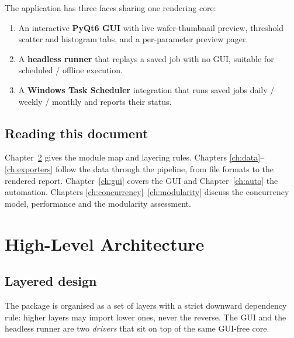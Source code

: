 \documentclass[11pt,a4paper]{report}
\begin{document}
The application has three faces sharing one rendering core:

\begin{enumerate}[leftmargin=1.6em]
  \item An interactive \textbf{PyQt6 GUI} with live wafer-thumbnail preview,
        threshold scatter and histogram tabs, and a per-parameter preview pager.
  \item A \textbf{headless runner} that replays a saved job with no GUI, suitable
        for scheduled / offline execution.
  \item A \textbf{Windows Task Scheduler} integration that runs saved jobs
        daily / weekly / monthly and reports their status.
\end{enumerate}

\section{Reading this document}
Chapter~\ref{ch:arch} gives the module map and layering rules. Chapters
\ref{ch:data}--\ref{ch:exporters} follow the data through the pipeline, from file
formats to the rendered report. Chapter~\ref{ch:gui} covers the GUI and
Chapter~\ref{ch:auto} the automation. Chapters
\ref{ch:concurrency}--\ref{ch:modularity} discuss the concurrency model,
performance and the modularity assessment.

\chapter{High-Level Architecture}\label{ch:arch}

\section{Layered design}
The package is organised as a set of layers with a strict downward dependency
rule: higher layers may import lower ones, never the reverse. The GUI and the
headless runner are two \emph{drivers} that sit on top of the same
GUI-free core.
\end{document}
